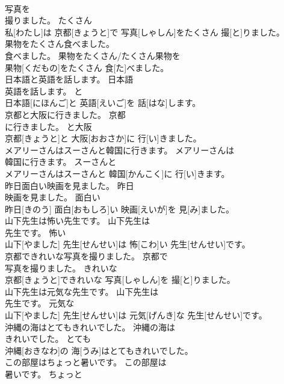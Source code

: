 \documentclass[8pt]{extreport}
\begin{document}
\begin{CJK}{UTF8}{min}
\\	写真を
\\	撮りました。	たくさん	
\\	私[わたし]は 京都[きょうと]で 写真[しゃしん]をたくさん 撮[と]りました。	
\\	果物をたくさん食べました。	
\\	食べました。	果物をたくさん/たくさん果物を	
\\	果物[くだもの]をたくさん 食[た]べました。	
\\	日本語と英語を話します。	日本語
\\	英語を話します。	と	
\\	日本語[にほんご]と 英語[えいご]を 話[はな]します。	
\\	京都と大阪に行きました。	京都
\\	に行きました。	と大阪	
\\	京都[きょうと]と 大阪[おおさか]に 行[い]きました。	
\\	メアリーさんはスーさんと韓国に行きます。	メアリーさんは
\\	韓国に行きます。	スーさんと	
\\	メアリーさんはスーさんと 韓国[かんこく]に 行[い]きます。	
\\	昨日面白い映画を見ました。	昨日
\\	映画を見ました。	面白い	
\\	昨日[きのう] 面白[おもしろ]い 映画[えいが]を 見[み]ました。	
\\	山下先生は怖い先生です。	山下先生は
\\	先生です。	怖い	
\\	山下[やました] 先生[せんせい]は 怖[こわ]い 先生[せんせい]です。	
\\	京都できれいな写真を撮りました。	京都で
\\	写真を撮りました。	きれいな	
\\	京都[きょうと]できれいな 写真[しゃしん]を 撮[と]りました。	
\\	山下先生は元気な先生です。	山下先生は
\\	先生です。	元気な	
\\	山下[やました] 先生[せんせい]は 元気[げんき]な 先生[せんせい]です。	
\\	沖縄の海はとてもきれいでした。	沖縄の海は
\\	きれいでした。	とても	
\\	沖縄[おきなわ]の 海[うみ]はとてもきれいでした。	
\\	この部屋はちょっと暑いです。	この部屋は
\\	暑いです。	ちょっと	

\end{CJK}
\end{document}
